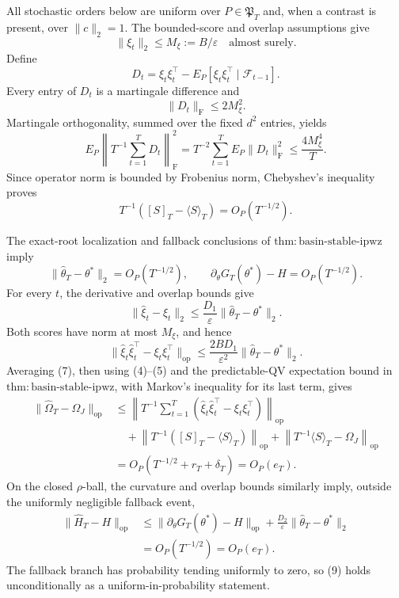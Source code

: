 All stochastic orders below are uniform over \(P\in\mathfrak P_T\) and, when a contrast is present, over \(\|c\|_2=1\). The bounded-score and overlap assumptions give
\[
 \|\xi_t\|_2\le M_\xi:=B/\varepsilon \quad\text{almost surely}. \tag{1}
\]
Define
\[
 D_t=\xi_t\xi_t^\top-E_P[\xi_t\xi_t^\top\mid\mathcal F_{t-1}].
\]
Every entry of \(D_t\) is a martingale difference and
\[
 \|D_t\|_{\mathrm F}\le2M_\xi^2. \tag{2}
\]
Martingale orthogonality, summed over the fixed \(d^2\) entries, yields
\[
 E_P\left\|T^{-1}\sum_{t=1}^TD_t\right\|_{\mathrm F}^2
 =T^{-2}\sum_{t=1}^TE_P\|D_t\|_{\mathrm F}^2
 \le \frac{4M_\xi^4}{T}. \tag{3}
\]
Since operator norm is bounded by Frobenius norm, Chebyshev's inequality proves
\[
 T^{-1}([S]_T-\langle S\rangle_T)=O_P(T^{-1/2}). \tag{4}
\]

The exact-root localization and fallback conclusions of \(\mathrm{thm:basin\text{-}stable\text{-}ipwz}\) imply
\[
 \|\widehat\theta_T-\theta^*\|_2=O_P(T^{-1/2}),
 \qquad \partial_\theta G_T(\theta^*)-H=O_P(T^{-1/2}). \tag{5}
\]
For every \(t\), the derivative and overlap bounds give
\[
 \|\widehat\xi_t-\xi_t\|_2
 \le \frac{D_1}{\varepsilon}\|\widehat\theta_T-\theta^*\|_2. \tag{6}
\]
Both scores have norm at most \(M_\xi\), and hence
\[
 \|\widehat\xi_t\widehat\xi_t^\top-\xi_t\xi_t^\top\|_{\mathrm{op}}
 \le \frac{2BD_1}{\varepsilon^2}\|\widehat\theta_T-\theta^*\|_2. \tag{7}
\]
Averaging (7), then using (4)--(5) and the predictable-QV expectation bound in \(\mathrm{thm:basin\text{-}stable\text{-}ipwz}\), with Markov's inequality for its last term, gives
\[
\begin{aligned}
 \|\widehat\Omega_T-\Omega_J\|_{\mathrm{op}}
 &\le \left\|T^{-1}\sum_{t=1}^T
 (\widehat\xi_t\widehat\xi_t^\top-\xi_t\xi_t^\top)\right\|_{\mathrm{op}}\\
 &\quad+\left\|T^{-1}([S]_T-\langle S\rangle_T)\right\|_{\mathrm{op}}
 +\left\|T^{-1}\langle S\rangle_T-\Omega_J\right\|_{\mathrm{op}}\\
 &=O_P(T^{-1/2}+r_T+\delta_T)=O_P(e_T).
\end{aligned} \tag{8}
\]
On the closed \(\rho\)-ball, the curvature and overlap bounds similarly imply, outside the uniformly negligible fallback event,
\[
\begin{aligned}
 \|\widehat H_T-H\|_{\mathrm{op}}
 &\le\|\partial_\theta G_T(\theta^*)-H\|_{\mathrm{op}}
 +\frac{D_2}{\varepsilon}\|\widehat\theta_T-\theta^*\|_2\\
 &=O_P(T^{-1/2})=O_P(e_T).
\end{aligned} \tag{9}
\]
The fallback branch has probability tending uniformly to zero, so (9) holds unconditionally as a uniform-in-probability statement.

